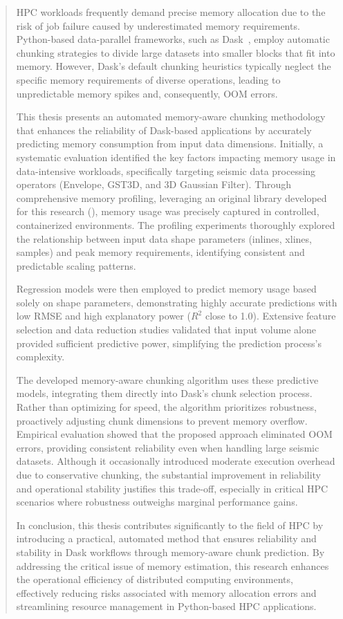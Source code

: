 \begin{abstract}
    \ac{HPC} workloads frequently demand precise memory allocation due to the risk of job failure caused by underestimated memory requirements.
    Python-based data-parallel frameworks, such as Dask~\cite{Rocklin2015}, employ automatic chunking strategies to divide large datasets into smaller blocks that fit into memory.
    However, Dask's default chunking heuristics typically neglect the specific memory requirements of diverse operations, leading to unpredictable memory spikes and, consequently, \ac{OOM} errors.

    This thesis presents an automated memory-aware chunking methodology that enhances the reliability of Dask-based applications by accurately predicting memory consumption from input data dimensions.
    Initially, a systematic evaluation identified the key factors impacting memory usage in data-intensive workloads, specifically targeting seismic data processing operators (Envelope, \ac{GST3D}, and \ac{3D} Gaussian Filter).
    Through comprehensive memory profiling, leveraging an original library developed for this research (\traceq), memory usage was precisely captured in controlled, containerized environments.
    The profiling experiments thoroughly explored the relationship between input data shape parameters (inlines, xlines, samples) and peak memory requirements, identifying consistent and predictable scaling patterns.

    Regression models were then employed to predict memory usage based solely on shape parameters, demonstrating highly accurate predictions with low \ac{RMSE} and high explanatory power ($R^2$ close to 1.0).
    Extensive feature selection and data reduction studies validated that input volume alone provided sufficient predictive power, simplifying the prediction process's complexity.

    The developed memory-aware chunking algorithm uses these predictive models, integrating them directly into Dask's chunk selection process.
    Rather than optimizing for speed, the algorithm prioritizes robustness, proactively adjusting chunk dimensions to prevent memory overflow.
    Empirical evaluation showed that the proposed approach eliminated \ac{OOM} errors, providing consistent reliability even when handling large seismic datasets.
    Although it occasionally introduced moderate execution overhead due to conservative chunking, the substantial improvement in reliability and operational stability justifies this trade-off, especially in critical \ac{HPC} scenarios where robustness outweighs marginal performance gains.

    In conclusion, this thesis contributes significantly to the field of \ac{HPC} by introducing a practical, automated method that ensures reliability and stability in Dask workflows through memory-aware chunk prediction.
    By addressing the critical issue of memory estimation, this research enhances the operational efficiency of distributed computing environments, effectively reducing risks associated with memory allocation errors and streamlining resource management in Python-based \ac{HPC} applications.
\end{abstract}